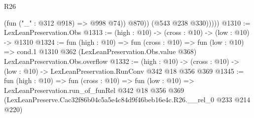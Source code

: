 \begin{lexlean}{R26}
\begin{coremodule}
                  (fun ("_" : @312 @918) => @998 @74))
                @870))
            (@543 @238 @330)))))
@1310 := LexLeanPreservation.Obs
@1313 := (high : @10) -> (cross : @10) -> (low : @10) -> @1310
@1324 := fun (high : @10) =>
  fun (cross : @10) =>
  fun (low : @10) =>
  cond.{1} @1310 @362 (LexLeanPreservation.Obs.value @368) LexLeanPreservation.Obs.overflow
@1332 := (high : @10) ->
  (cross : @10) -> (low : @10) -> LexLeanPreservation.RunConv @342 @18 @356 @369
@1345 := fun (high : @10) =>
  fun (cross : @10) =>
  fun (low : @10) =>
  LexLeanPreservation.run_of_funRel
    @342
    @18
    @356
    @369
    (LexLeanPreserve.Cac32f86b04c5a5e4c84d9f46beb16e4c.R26.__rel_0 @233 @214 @220)
\end{coremodule}
\end{lexlean}
